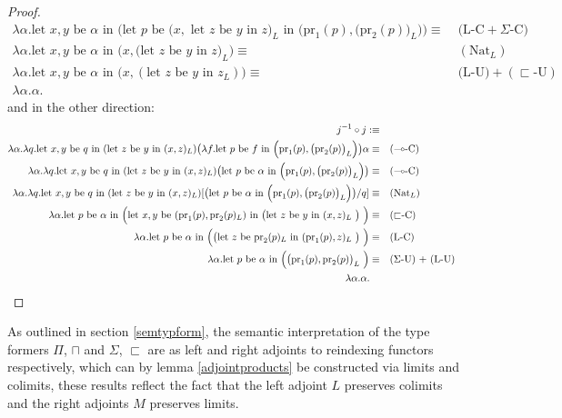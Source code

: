 \documentclass[a4paper,english]{lipics-v2018}
\begin{document}
\begin{theorem}
\begin{proof}
\[\begin{split}
    \lambda \alpha. \text{let $x, y$ be $\alpha$ in $\Big ($let $p$ be ($x,$ let $z$ be $y$ in $z)_L$ in $\Big (\text{pr}_1(p), \big  (\text{pr}_2(p)\big )_L\Big) \Big )$}  \equiv&\quad \text{(L-C} + \text{$\Sigma$-C})\\
    \lambda \alpha. \text{let $x, y$ be $\alpha$ in $\Big (x, \big  ( \text{let $z$ be $y$ in $z$}\big )_L \Big )$}  \equiv& \quad (\text{Nat}_L)\\
    \lambda \alpha. \text{let $x, y$ be $\alpha$ in $\Big (x, (\text{let $z$ be $y$ in $z_L$}) \Big )$}  \equiv& \quad \text{(L-U}) + (\text{$\sqsubset$-U})\\
    \lambda \alpha. \alpha. \quad &
\end{split}
\]
\normalsize
and in the other direction:
\small
\[
  \begin{split}
    j^{-1} \circ j : \equiv \\
    \lambda \alpha. \lambda q. \text{let $x, y$ be $q$ in (let $z$ be $y$ in $(x, z)_L$)} \big ( \lambda f. \text{let $p$ be $f$ in $\Big (\text{pr}_1(p), \big  (\text{pr}_2(p)\big )_L\Big)$}  \big ) \alpha \equiv& \quad (\text{$\multimap$-C})\\
    \lambda \alpha. \lambda q. \text{let $x, y$ be $q$ in (let $z$ be $y$ in $(x, z)_L$)} \big ( \text{let $p$ be $\alpha$ in $\Big (\text{pr}_1(p), \big  (\text{pr}_2(p)\big )_L\Big)$} \big ) \equiv& \quad (\text{$\multimap$-C})\\
        \lambda \alpha. \lambda q. \text{let $x, y$ be $q$ in (let $z$ be $y$ in $(x, z)_L$)} [\big ( \text{let $p$ be $\alpha$ in $\Big (\text{pr}_1(p), \big  (\text{pr}_2(p)\big )_L\Big)$} \big )/q] \equiv& \quad (\text{Nat}_L)\\
       \lambda \alpha. \text{let $p$ be $\alpha$ in \Big (let $x, y$ be $(\text{pr}_1(p), \text{pr}_2(p)_L)$ in \big (let $z$ be $y$ in $(x, z)_L$ \big ) \Big )} \equiv& \quad (\text{$\sqsubset$-C})\\
       \lambda \alpha. \text{let $p$ be $\alpha$ in \Big (\big (let $z$ be $\text{pr}_2(p)_L$ in $(\text{pr}_1(p), z)_L$ \big ) \Big )} \equiv& \quad (\text{L-C})\\
       \lambda \alpha. \text{let $p$ be $\alpha$ in \Big ($\big (\text{pr}_1(p), \text{pr}_2(p) \big )_L$ \Big )} \equiv& \quad \text{($\Sigma$-U) + (L-U)}\\
         \lambda \alpha. \alpha. \quad &
  \end{split}
\]
\normalsize
\end{proof}
\end{theorem}
As outlined in section \ref{semtypform}, the semantic interpretation of the type formers $\Pi$, $\sqcap$ and $\Sigma$, $\sqsubset$ are as left and right adjoints to reindexing functors respectively, which can by lemma \ref{adjointproducts} be constructed via limits and colimits, these results reflect the fact that the left adjoint $L$ preserves colimits and the right adjoints $M$ preserves limits.
\end{document}
